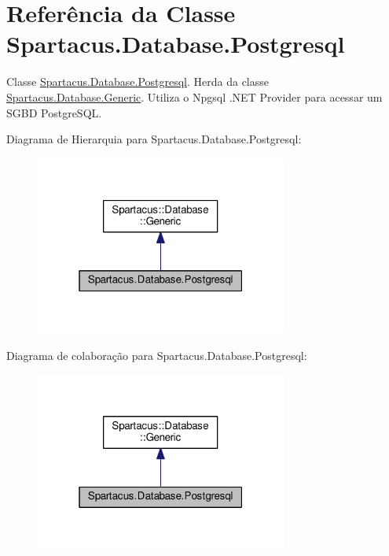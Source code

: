 \hypertarget{classSpartacus_1_1Database_1_1Postgresql}{\section{Referência da Classe Spartacus.\+Database.\+Postgresql}
\label{classSpartacus_1_1Database_1_1Postgresql}
}


Classe \hyperlink{classSpartacus_1_1Database_1_1Postgresql}{Spartacus.\+Database.\+Postgresql}. Herda da classe \hyperlink{classSpartacus_1_1Database_1_1Generic}{Spartacus.\+Database.\+Generic}. Utiliza o Npgsql .N\+E\+T Provider para acessar um S\+G\+B\+D Postgre\+S\+Q\+L.  




Diagrama de Hierarquia para Spartacus.\+Database.\+Postgresql\+:
\nopagebreak
\begin{figure}[H]
\begin{center}
\leavevmode
\includegraphics[width=235pt]{classSpartacus_1_1Database_1_1Postgresql__inherit__graph}
\end{center}
\end{figure}


Diagrama de colaboração para Spartacus.\+Database.\+Postgresql\+:
\nopagebreak
\begin{figure}[H]
\begin{center}
\leavevmode
\includegraphics[width=235pt]{classSpartacus_1_1Database_1_1Postgresql__coll__graph}
\end{center}
\end{figure}

